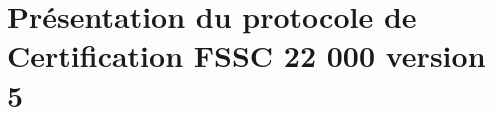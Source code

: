 


\setcounter{mtc}{3}
\chapter{ Présentation du protocole de Certification FSSC 22 000 version 5}
\minitoc %
\graphicspath{{Chapter1/figures/}}


\pagestyle{fancy}
\fancyhf{}
\fancyhead[R]{\bfseries\rightmark}
\fancyfoot[R]{\thepage}
\renewcommand{\headrulewidth}{0.5pt}
\renewcommand{\footrulewidth}{0pt}
\renewcommand{\chaptermark}[1]{\markboth{\MakeUppercase{\chaptername~\thechapter. #1 }}{}}
\renewcommand{\sectionmark}[1]{\markright{\thechapter.\thesection~ #1}}

